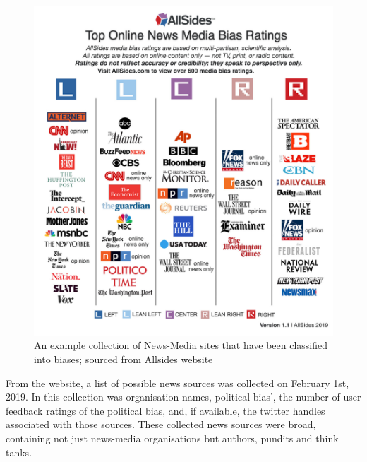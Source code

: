 \begin{figure}[h!]
	\centering
	\includegraphics[width=\linewidth]{chapter1/figs/AllSidesMediaBiasChart}
	\caption{An example collection of News-Media sites that have been classified into biases; sourced from Allsides website~\cite{gable_media_2019}}
	\label{fig:allsidesmediabiaschart}
\end{figure}



From the website, a list of possible news sources was collected on February 1st, 2019. In this collection was organisation names, political bias', the number of user feedback ratings of the political bias, and, if available, the twitter handles associated with those sources. These collected news sources were broad, containing not just news-media organisations but authors, pundits and think tanks. 

